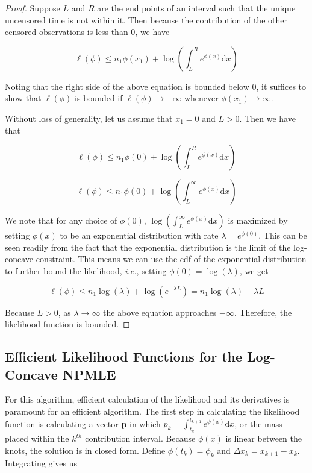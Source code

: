 \documentclass[10pt]{article}
\begin{document}
\begin{proof}
	Suppose $L$ and $R$ are the end points of an interval such that the unique uncensored time is not within it. Then because the contribution of the other censored observations is less than 0, we have
	
	\[
	\ell(\phi) \leq n_1 \phi(x_1) + \log \left( \displaystyle \int_L^R e^{\phi(x)} \mathrm{d}x \right)
	\]
	
	Noting that the right side of the above equation is bounded below 0, it suffices to show that $\ell(\phi)$ is bounded if $\ell(\phi) \rightarrow -\infty$ whenever $\phi(x_1) \rightarrow \infty$. 
	
	Without loss of generality, let us assume that $x_1 = 0$ and $L > 0$. Then we have that 
	
	\[
	 \ell(\phi) \leq n_1 \phi(0) + \log \left( \displaystyle \int_L^R e^{\phi(x)} \mathrm{d}x \right) 
	\]
	
	\[
	\ell(\phi) \leq n_1 \phi(0) + \log \left( \displaystyle \int_L^\infty e^{\phi(x)} \mathrm{d}x \right)
	\]

	We note that for any choice of $\phi(0)$, $\log \left( \displaystyle \int_L^\infty e^{\phi(x)} \mathrm{d}x \right) $ is maximized by setting $\phi(x)$ to be an exponential distribution with rate $\lambda = e^{\phi(0)}$. This can be seen readily from the fact that the exponential distribution is the limit of the log-concave constraint. This means we can use the cdf of the exponential distribution to further bound the likelihood, \emph{i.e.}, setting $\phi(0) = \log(\lambda)$, we get 
	
	\[
	\ell(\phi) \leq n_1 \log(\lambda) + \log( e^{- \lambda L} ) = n_1 \log(\lambda) - \lambda L
	\]
	
	Because $L > 0$, as $\lambda \rightarrow \infty$ the above equation approaches $-\infty$. Therefore, the likelihood function is bounded. 
	
	\end{proof}

	\subsection{Efficient Likelihood Functions for the Log-Concave NPMLE}
		
	For this algorithm, efficient calculation of the likelihood and its derivatives is paramount for an efficient algorithm. The first step in calculating the likelihood function is calculating a vector {\bf p} in which $p_k = \int_{t_k}^{t_{k+1}} e^ { \phi(x) } \mathrm{d}x$, or the mass placed within the $k^{th}$ contribution interval. Because $\phi(x)$ is linear between the knots, the solution is in closed form. Define $\phi(t_k) = \phi_k$ and $\Delta x_k = x_{k+1} - x_k$. Integrating gives us 
	
\end{document}
